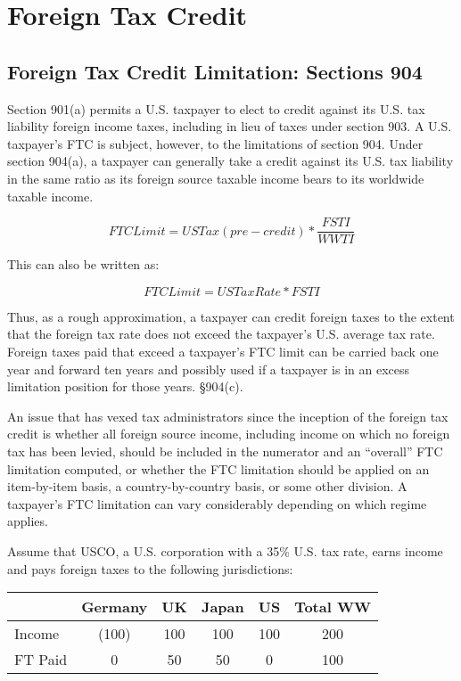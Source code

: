 \chapter{Foreign Tax Credit}

\section{Foreign Tax Credit Limitation:  Sections 904}
 

Section 901(a) permits a U.S. taxpayer to elect to credit against its U.S. tax liability foreign income taxes, including in lieu of taxes under section 903.  A U.S. taxpayer's FTC is subject, however, to the limitations of section 904. Under section 904(a), a taxpayer can generally take a credit against its U.S. tax liability in the same ratio as its foreign source taxable income bears to its worldwide taxable income.
 
  \begin{equation*}
FTC Limit = US Tax (pre-credit) * \frac{FSTI}{ WWTI}
\end{equation*}


This can also be written as:

\begin{equation*}
FTC Limit = US Tax Rate * FSTI
\end{equation*}

Thus, as a rough approximation, a taxpayer can credit foreign taxes to the extent that the foreign tax rate does not exceed the taxpayer's U.S. average tax rate.  Foreign taxes paid that exceed a taxpayer's FTC limit can be carried back one year and forward ten years and possibly used if a taxpayer is in an excess limitation position for those years.  \S904(c).

An issue that has vexed tax administrators since the inception of the foreign tax credit is whether all foreign source income, including income on which no foreign tax has been levied, should be included in the numerator and an ``overall'' FTC limitation computed, or whether the FTC limitation should be applied on an item-by-item basis, a country-by-country basis, or some other division.  A taxpayer's FTC limitation can vary considerably depending on which regime applies.  

Assume that USCO, a U.S. corporation with a 35\% U.S. tax rate, earns income and pays foreign taxes to the following jurisdictions:  

\begin{center}
 
  \begin{tabular}{l c c c c c}         
  & Germany & UK & Japan & US & Total WW\\
  \hline
  Income & (100) & 100 & 100 & 100 & 200 \\
  FT Paid & 0 & 50 & 50 & 0 & 100 \\
  \hline
    \end{tabular}
   \end{center}


